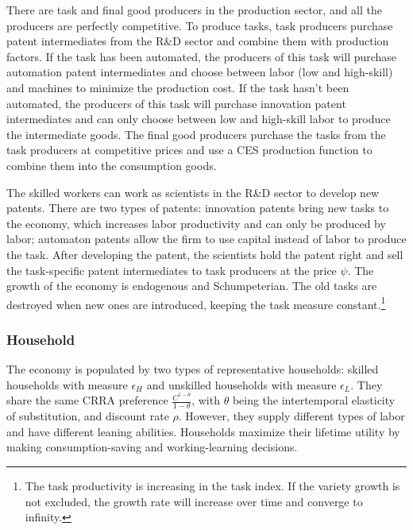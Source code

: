 \documentclass[12pt]{article}
\begin{document}
There are task and final good producers in the production sector, and all the producers are perfectly competitive. To produce tasks, task producers purchase patent intermediates from the R\&D sector and combine them with production factors. If the task has been automated, the producers of this task will purchase automation patent intermediates and choose between labor (low and high-skill) and machines to minimize the production cost. If the task hasn't been automated, the producers of this task will purchase innovation patent intermediates and can only choose between low and high-skill labor to produce the intermediate goods. The final good producers purchase the tasks from the task producers at competitive prices and use a CES production function to combine them into the consumption goods. 

The skilled workers can work as scientists in the R\&D sector to develop new patents. There are two types of patents: innovation patents bring new tasks to the economy, which increases labor productivity and can only be produced by labor; automaton patents allow the firm to use capital instead of labor to produce the task. After developing the patent, the scientists hold the patent right and sell the task-specific patent intermediates to task producers at the price $\psi$. The growth of the economy is endogenous and Schumpeterian. The old tasks are destroyed when new ones are introduced, keeping the task measure constant.\footnote{The task productivity is increasing in the task index. If the variety growth is not excluded, the growth rate will increase over time and converge to infinity.} 

\subsubsection*{Household}
The economy is populated by two types of representative households: skilled households with measure $\epsilon_H$ and unskilled households with measure $\epsilon_L$. They share the same CRRA preference $\frac{C^{1-\theta}}{1-\theta}$, with $\theta$ being the intertemporal elasticity of substitution, and discount rate $\rho$. However, they supply different types of labor and have different leaning abilities. Households maximize their lifetime utility by making consumption-saving and working-learning decisions. 
\end{document}
